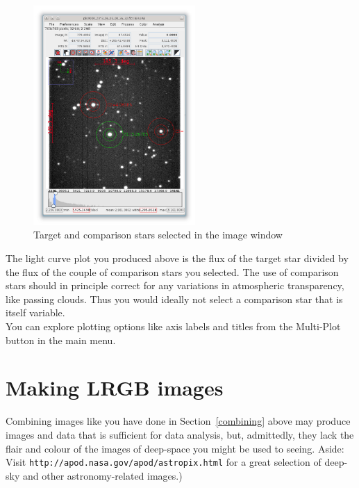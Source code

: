 \documentclass[12pt,twoside,a4paper]{report}
\begin{document}
\begin{enumerate}
  \begin{figure}[ht]
  \centering
    \includegraphics[width=0.55\textwidth]{documentation_images/photometry_targets.jpg}
    \caption{\label{fig:targets}Target and comparison stars selected in the image window}
 \end{figure}
 \end{enumerate}

The light curve plot you produced above is the flux of the target star divided by the flux of the couple of comparison stars you selected. The use of comparison stars should in principle correct for any variations in atmospheric transparency, like passing clouds. Thus you would ideally not select a comparison star that is itself variable.\\

You can explore plotting options like axis labels and titles from the Multi-Plot button in the main menu.



\section{Making LRGB images}
Combining images like you have done in Section~\ref{combining} above may produce images and data that is sufficient for data analysis, but, admittedly, they lack the flair and colour of the images of deep-space you might be used to seeing. Aside: Visit {\tt http://apod.nasa.gov/apod/astropix.html} for a great selection of deep-sky and other astronomy-related images.)\\
\end{document}
